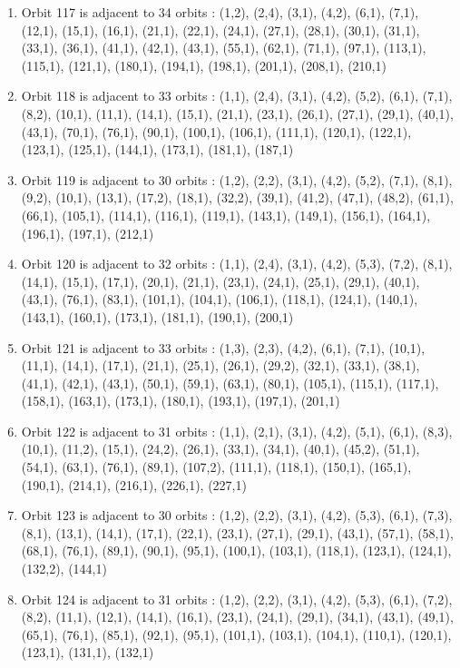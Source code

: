 \documentclass[12pt]{article}
\begin{document}
\begin{enumerate}
\item Orbit 117 is adjacent to 34 orbits : (1,2), (2,4), (3,1), (4,2), (6,1), (7,1), (12,1), (15,1), (16,1), (21,1), (22,1), (24,1), (27,1), (28,1), (30,1), (31,1), (33,1), (36,1), (41,1), (42,1), (43,1), (55,1), (62,1), (71,1), (97,1), (113,1), (115,1), (121,1), (180,1), (194,1), (198,1), (201,1), (208,1), (210,1)
\item Orbit 118 is adjacent to 33 orbits : (1,1), (2,4), (3,1), (4,2), (5,2), (6,1), (7,1), (8,2), (10,1), (11,1), (14,1), (15,1), (21,1), (23,1), (26,1), (27,1), (29,1), (40,1), (43,1), (70,1), (76,1), (90,1), (100,1), (106,1), (111,1), (120,1), (122,1), (123,1), (125,1), (144,1), (173,1), (181,1), (187,1)
\item Orbit 119 is adjacent to 30 orbits : (1,2), (2,2), (3,1), (4,2), (5,2), (7,1), (8,1), (9,2), (10,1), (13,1), (17,2), (18,1), (32,2), (39,1), (41,2), (47,1), (48,2), (61,1), (66,1), (105,1), (114,1), (116,1), (119,1), (143,1), (149,1), (156,1), (164,1), (196,1), (197,1), (212,1)
\item Orbit 120 is adjacent to 32 orbits : (1,1), (2,4), (3,1), (4,2), (5,3), (7,2), (8,1), (14,1), (15,1), (17,1), (20,1), (21,1), (23,1), (24,1), (25,1), (29,1), (40,1), (43,1), (76,1), (83,1), (101,1), (104,1), (106,1), (118,1), (124,1), (140,1), (143,1), (160,1), (173,1), (181,1), (190,1), (200,1)
\item Orbit 121 is adjacent to 33 orbits : (1,3), (2,3), (4,2), (6,1), (7,1), (10,1), (11,1), (14,1), (17,1), (21,1), (25,1), (26,1), (29,2), (32,1), (33,1), (38,1), (41,1), (42,1), (43,1), (50,1), (59,1), (63,1), (80,1), (105,1), (115,1), (117,1), (158,1), (163,1), (173,1), (180,1), (193,1), (197,1), (201,1)
\item Orbit 122 is adjacent to 31 orbits : (1,1), (2,1), (3,1), (4,2), (5,1), (6,1), (8,3), (10,1), (11,2), (15,1), (24,2), (26,1), (33,1), (34,1), (40,1), (45,2), (51,1), (54,1), (63,1), (76,1), (89,1), (107,2), (111,1), (118,1), (150,1), (165,1), (190,1), (214,1), (216,1), (226,1), (227,1)
\item Orbit 123 is adjacent to 30 orbits : (1,2), (2,2), (3,1), (4,2), (5,3), (6,1), (7,3), (8,1), (13,1), (14,1), (17,1), (22,1), (23,1), (27,1), (29,1), (43,1), (57,1), (58,1), (68,1), (76,1), (89,1), (90,1), (95,1), (100,1), (103,1), (118,1), (123,1), (124,1), (132,2), (144,1)
\item Orbit 124 is adjacent to 31 orbits : (1,2), (2,2), (3,1), (4,2), (5,3), (6,1), (7,2), (8,2), (11,1), (12,1), (14,1), (16,1), (23,1), (24,1), (29,1), (34,1), (43,1), (49,1), (65,1), (76,1), (85,1), (92,1), (95,1), (101,1), (103,1), (104,1), (110,1), (120,1), (123,1), (131,1), (132,1)

\end{enumerate}
\end{document}
